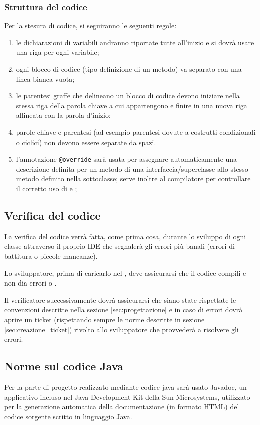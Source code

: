 {\subsubsection{Struttura del codice}
Per la stesura di codice, si seguiranno le seguenti regole:
\begin{enumerate}
\item le dichiarazioni di variabili andranno riportate tutte all'inizio e si dovrà usare una riga per ogni variabile;
\item ogni blocco di codice (tipo definizione di un metodo) va separato  con una linea bianca vuota;
\item le parentesi graffe che delineano un blocco di codice devono iniziare nella stessa riga della parola chiave a cui appartengono e finire in una nuova riga allineata con la parola d'inizio;
\item parole chiave e parentesi (ad esempio parentesi dovute a costrutti condizionali o ciclici) non devono essere separate da spazi.
\item l'annotazione \verb+@override+ sarà usata per assegnare automaticamente una descrizione definita per un metodo di una interfaccia/superclasse allo stesso metodo definito nella sottoclasse; serve inoltre al compilatore per controllare il corretto uso di  e ;
\end{enumerate}

\subsection{Verifica del codice}
La verifica del codice verrà fatta, come prima cosa, durante lo sviluppo di ogni classe attraverso il proprio IDE che segnalerà gli errori più banali (errori di battitura o piccole mancanze).

Lo sviluppatore, prima di caricarlo nel , deve assicurarsi che il codice compili e non dia errori o .

Il verificatore successivamente dovrà assicurarsi che siano state rispettate le convenzioni descritte nella sezione \vref{sec:progettazione} e in caso di errori dovrà aprire un ticket (rispettando sempre le norme descritte in sezione \vref{sec:creazione_ticket}) rivolto allo sviluppatore che provvederà a risolvere gli errori.

\subsection{Norme sul codice Java}
Per la parte di progetto realizzato mediante codice java sarà usato Javadoc, un applicativo incluso nel Java Development Kit della Sun Microsystems, utilizzato per la generazione automatica della documentazione (in formato \underline{HTML}) del codice sorgente scritto in linguaggio Java.

}
